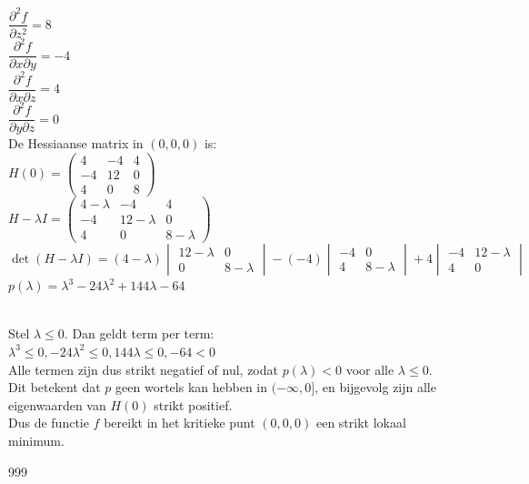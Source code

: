 \documentclass[a4paper]{article}
\begin{document}
$\dfrac{\partial^{2} f}{\partial z^{2}} = 8$\\

$\dfrac{\partial^{2} f}{\partial x \partial y} = -4$\\

$\dfrac{\partial^{2} f}{\partial x \partial z} = 4$\\ 

$\dfrac{\partial^{2} f}{\partial y \partial z} = 0$\\

De Hessiaanse matrix in $(0,0,0)$ is:\\

$H(0) = \left(\begin{array}{ccc}
4 & -4 & 4 \\ -4 & 12 & 0 \\ 4 & 0 & 8 \end{array} \right)$\\

$H - \lambda I = \left( \begin{array}{ccc} 4-\lambda & -4 & 4 \\ -4 & 12-\lambda & 0 \\ 4 & 0 & 8-\lambda \end{array} \right)$\\

$\det(H - \lambda I) = (4-\lambda)\begin{vmatrix} 12-\lambda & 0 \\ 0 & 8-\lambda \end{vmatrix}
-(-4)\begin{vmatrix} -4 & 0 \\ 4 & 8-\lambda \end{vmatrix}
+4\begin{vmatrix} -4 & 12-\lambda \\ 4 & 0 \end{vmatrix}$\\

$p(\lambda) = \lambda^{3} - 24\lambda^{2} + 144\lambda - 64$\\\

Stel $\lambda \leq 0$. Dan geldt term per term:\\

$\lambda^{3} \leq 0, -24\lambda^{2} \leq 0,  144\lambda \leq 0,  -64 < 0$\\

Alle termen zijn dus strikt negatief of nul, zodat $p(\lambda) < 0$ voor alle $\lambda \leq 0$.\\

Dit betekent dat $p$ geen wortels kan hebben in $(-\infty, 0]$, en bijgevolg zijn alle eigenwaarden van $H(0)$ strikt positief.\\

Dus de functie $f$ bereikt in het kritieke punt $(0, 0, 0)$ een strikt lokaal minimum.\\

\begin{thebibliography}{999}
\end{thebibliography}
\end{document}
